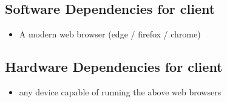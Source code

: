 \documentclass[letterpaper]{article}
\begin{document}
  \subsection{Software Dependencies for client}
    \begin{itemize}
      \item A modern web browser (edge / firefox / chrome)
    \end{itemize}

    \subsection{Hardware Dependencies for client}
      \begin{itemize}
        \item any device capable of running the above web browsers
      \end{itemize}

\pagebreak

\printindex
\listoffigures
\pagebreak
\end{document}
